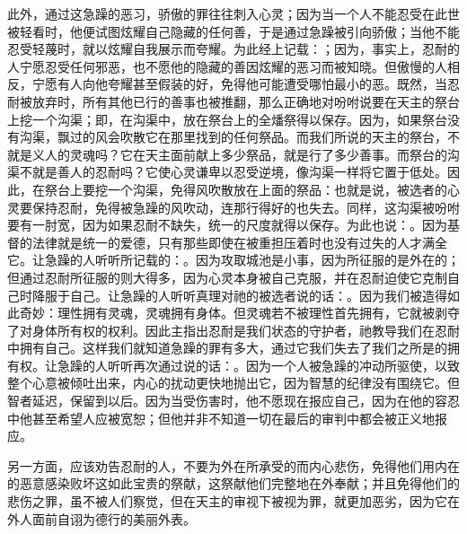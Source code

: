 此外，通过这急躁的恶习，骄傲的罪往往刺入心灵；因为当一个人不能忍受在此世被轻看时，他便试图炫耀自己隐藏的任何善，于是通过急躁被引向骄傲；当他不能忍受轻蔑时，就以炫耀自我展示而夸耀。为此经上记载：；因为，事实上，忍耐的人宁愿忍受任何邪恶，也不愿他的隐藏的善因炫耀的恶习而被知晓。但傲慢的人相反，宁愿有人向他夸耀甚至假装的好，免得他可能遭受哪怕最小的恶。既然，当忍耐被放弃时，所有其他已行的善事也被推翻，那么正确地对吩咐说要在天主的祭台上挖一个沟渠；即，在沟渠中，放在祭台上的全燔祭得以保存。因为，如果祭台没有沟渠，飘过的风会吹散它在那里找到的任何祭品。而我们所说的天主的祭台，不就是义人的灵魂吗？它在天主面前献上多少祭品，就是行了多少善事。而祭台的沟渠不就是善人的忍耐吗？它使心灵谦卑以忍受逆境，像沟渠一样将它置于低处。因此，在祭台上要挖一个沟渠，免得风吹散放在上面的祭品：也就是说，被选者的心灵要保持忍耐，免得被急躁的风吹动，连那行得好的也失去。同样，这沟渠被吩咐要有一肘宽，因为如果忍耐不缺失，统一的尺度就得以保存。为此也说：。因为基督的法律就是统一的爱德，只有那些即使在被重担压着时也没有过失的人才满全它。让急躁的人听听所记载的：。因为攻取城池是小事，因为所征服的是外在的；但通过忍耐所征服的则大得多，因为心灵本身被自己克服，并在忍耐迫使它克制自己时降服于自己。让急躁的人听听真理对祂的被选者说的话：。因为我们被造得如此奇妙：理性拥有灵魂，灵魂拥有身体。但灵魂若不被理性首先拥有，它就被剥夺了对身体所有权的权利。因此主指出忍耐是我们状态的守护者，祂教导我们在忍耐中拥有自己。这样我们就知道急躁的罪有多大，通过它我们失去了我们之所是的拥有权。让急躁的人听听再次通过说的话：。因为一个人被急躁的冲动所驱使，以致整个心意被倾吐出来，内心的扰动更快地抛出它，因为智慧的纪律没有围绕它。但智者延迟，保留到以后。因为当受伤害时，他不愿现在报应自己，因为在他的容忍中他甚至希望人应被宽恕；但他并非不知道一切在最后的审判中都会被正义地报应。\par

另一方面，应该劝告忍耐的人，不要为外在所承受的而内心悲伤，免得他们用内在的恶意感染败坏这如此宝贵的祭献，这祭献他们完整地在外奉献；并且免得他们的悲伤之罪，虽不被人们察觉，但在天主的审视下被视为罪，就更加恶劣，因为它在外人面前自诩为德行的美丽外表。\par

